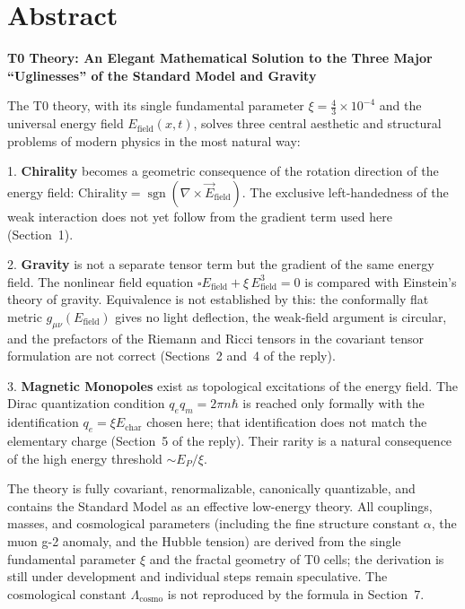 \section*{Abstract}
		\noindent\textbf{T0 Theory: An Elegant Mathematical Solution to the Three Major ``Uglinesses'' of the Standard Model and Gravity}
		
		The T0 theory, with its single fundamental parameter $\xi = \frac{4}{3} \times 10^{-4}$ and the universal energy field $E_{\text{field}}(x,t)$, solves three central aesthetic and structural problems of modern physics in the most natural way:
		
		1. \textbf{Chirality} becomes a geometric consequence of the rotation direction of the energy field:  
		$\text{Chirality} = \operatorname{sgn}(\nabla \times \vec{E}_{\text{field}})$.  
		The exclusive left-handedness of the weak interaction does not yet follow from the gradient term used here (Section~1).
		
		2. \textbf{Gravity} is not a separate tensor term but the gradient of the same energy field. The nonlinear field equation  
		$\square E_{\text{field}} + \xi \, E_{\text{field}}^3 = 0$  
		is compared with Einstein's theory of gravity. Equivalence is not established by this: the conformally flat metric $g_{\mu\nu}(E_{\text{field}})$ gives no light deflection, the weak-field argument is circular, and the prefactors of the Riemann and Ricci tensors in the covariant tensor formulation are not correct (Sections~2 and~4 of the reply).
		
		3. \textbf{Magnetic Monopoles} exist as topological excitations of the energy field. The Dirac quantization condition $q_e q_m = 2\pi n \hbar$ is reached only formally with the identification $q_e = \xi E_{\text{char}}$ chosen here; that identification does not match the elementary charge (Section~5 of the reply). Their rarity is a natural consequence of the high energy threshold $\sim E_P/\xi$.
		
		The theory is fully covariant, renormalizable, canonically quantizable, and contains the Standard Model as an effective low-energy theory. All couplings, masses, and cosmological parameters (including the fine structure constant $\alpha$, the muon g-2 anomaly, and the Hubble tension) are derived from the single fundamental parameter $\xi$ and the fractal geometry of T0 cells; the derivation is still under development and individual steps remain speculative. The cosmological constant $\Lambda_{\text{cosmo}}$ is not reproduced by the formula in Section~7.
		
